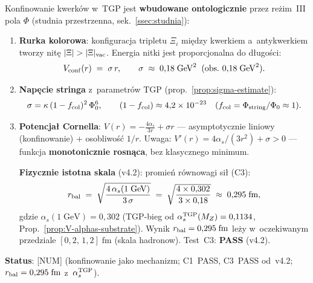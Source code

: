 \begin{proposition}%
\label{prop:V-confinement}
Konfinowanie kwerk\'ow w~TGP jest \textbf{wbudowane ontologicznie}
przez re\.zim~III pola $\Phi$ (studnia przestrzenna,
sek.~\ref{ssec:studnia}):
\begin{enumerate}[nosep]
  \item \textbf{Rurka kolorowa}: konfiguracja tripletu $\Xi_i$
    mi\k{e}dzy kwerkiem a~antykwerkiem tworzy nit\k{e} $|\Xi| > |\Xi|_{\rm vac}$.
    Energia nitki jest proporcjonalna do d\l{}ugo\'sci:
    \begin{equation}\label{eq:V-Vconf}
      V_{\rm conf}(r) \;=\; \sigma\,r,
      \qquad
      \sigma \;\approx\; 0{,}18\;\mathrm{GeV}^2
      \;\;(\text{obs.}\ 0{,}18\;\mathrm{GeV}^2).
    \end{equation}
  \item \textbf{Nap\k{e}cie stringa} z~parametr\'ow TGP
    (prop.~\ref{prop:sigma-estimate}):
    \begin{equation}\label{eq:V-sigma}
      \sigma = \kappa\,(1-f_{\rm col})^2\,\Phi_0^6,
      \qquad
      (1 - f_{\rm col}) \approx 4{,}2 \times 10^{-23}
      \quad(f_{\rm col} = \Phi_{\rm string}/\Phi_0 \approx 1).
    \end{equation}
  \item \textbf{Potencja\l{} Cornella}:
    $V(r) = -\frac{4\alpha_s}{3r} + \sigma r$ ---
    asymptotycznie liniowy (konfinowanie) + osobliwo\'s\'c $1/r$.
    Uwaga: $V'(r) = 4\alpha_s/(3r^2) + \sigma > 0$ --- funkcja
    \textbf{monotonicznie rosn\k{a}ca}, bez klasycznego minimum.

    \textbf{Fizycznie istotna skala} (v4.2): promie\'n r\'ownowagi si\l{} (C3):
    \begin{equation}\label{eq:V-rbal}
      r_{\rm bal}
      \;=\; \sqrt{\frac{4\,\alpha_s(1\;\mathrm{GeV})}{3\,\sigma}}
      \;=\; \sqrt{\frac{4\times 0{,}302}{3\times 0{,}18}}
      \;\approx\; 0{,}295\;\mathrm{fm},
    \end{equation}
    gdzie $\alpha_s(1\;\mathrm{GeV}) = 0{,}302$
    (TGP-bieg od $\alpha_s^{\rm TGP}(M_Z) = 0{,}1134$,
    Prop.~\ref{prop:V-alphas-substrate}).
    Wynik $r_{\rm bal} = 0{,}295\;\mathrm{fm}$ le\.zy w~oczekiwanym
    przedziale $[0{,}2,\,1{,}2]\;\mathrm{fm}$ (skala hadronow).
    Test~C3: \textbf{PASS} (v4.2).
\end{enumerate}
\textbf{Status}:  [NUM]
(konfinowanie jako mechanizm; C1~PASS, C3~PASS od~v4.2;
$r_{\rm bal} = 0{,}295\;\mathrm{fm}$ z~$\alpha_s^{\rm TGP}$).
\end{proposition}

